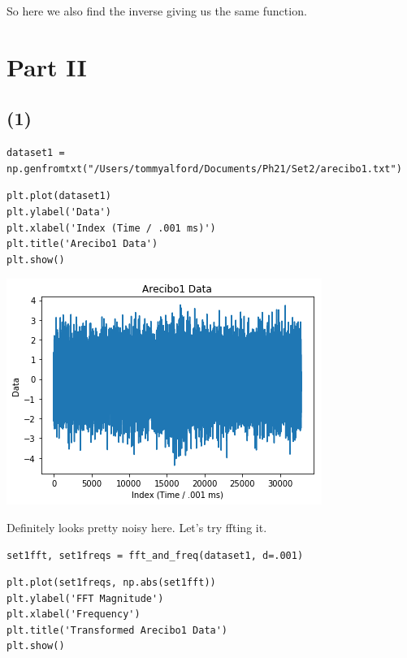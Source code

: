 \documentclass[11pt]{article}
\begin{document}
So here we also find the inverse giving us the same function.

\section*{Part II}
\label{sec-2}

\subsection*{(1)}
\label{sec-2-1}

\begin{verbatim}
dataset1 = np.genfromtxt("/Users/tommyalford/Documents/Ph21/Set2/arecibo1.txt")
\end{verbatim}


\begin{verbatim}
plt.plot(dataset1)
plt.ylabel('Data')
plt.xlabel('Index (Time / .001 ms)')
plt.title('Arecibo1 Data')
plt.show()
\end{verbatim}

\includegraphics[width=.9\linewidth]{./obipy-resources/333D2G.png}

Definitely looks pretty noisy here. Let's try ffting it.


\begin{verbatim}
set1fft, set1freqs = fft_and_freq(dataset1, d=.001)
\end{verbatim}


\begin{verbatim}
plt.plot(set1freqs, np.abs(set1fft))
plt.ylabel('FFT Magnitude')
plt.xlabel('Frequency')
plt.title('Transformed Arecibo1 Data')
plt.show()
\end{verbatim}
\end{document}
